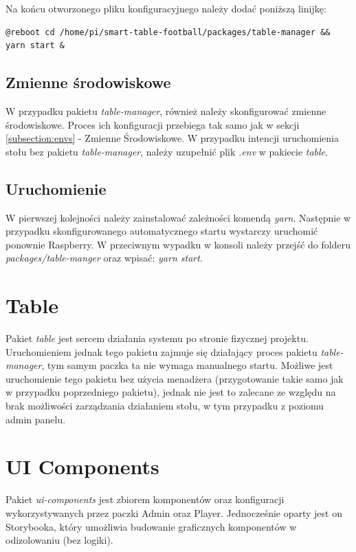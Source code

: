Na końcu otworzonego pliku konfiguracyjnego należy dodać poniższą linijkę:
\begin{lstlisting}[caption={Fragment konfiguracji crontab}]
@reboot cd /home/pi/smart-table-football/packages/table-manager && yarn start &
\end{lstlisting}

\subsection{Zmienne środowiskowe}
W przypadku pakietu \textit{table-manager}, również należy skonfigurować zmienne środowiskowe. Proces ich konfiguracji przebiega tak samo jak w sekcji \ref{subsection:envs} - Zmienne Środowiskowe. W przypadku intencji uruchomienia stołu bez pakietu \textit{table-manager}, należy uzupełnić plik \textit{.env} w pakiecie \textit{table}.

\subsection{Uruchomienie}
W pierwszej kolejności należy zainstalować zależności komendą \textit{yarn}. Następnie w przypadku skonfigurowanego automatycznego startu wystarczy uruchomić ponownie Raspberry. W przeciwnym wypadku w konsoli należy przejść do folderu \textit{packages/table-manger} oraz wpisać: \textit{yarn start}.

\section{Table}
Pakiet \textit{table} jest sercem działania systemu po stronie fizycznej projektu. Uruchomieniem jednak tego pakietu zajmuje się działający proces pakietu \textit{table-manager}, tym samym paczka ta nie wymaga manualnego startu. Możliwe jest uruchomienie tego pakietu bez użycia menadżera (przygotowanie takie samo jak w przypadku poprzedniego pakietu), jednak nie jest to zalecane ze względu na brak możliwości zarządzania działaniem stołu, w tym przypadku z poziomu admin panelu.

\section{UI Components}
Pakiet \textit{ui-components} jest zbiorem komponentów oraz konfiguracji wykorzystywanych przez paczki Admin oraz Player. Jednocześnie oparty jest on Storybooka, który umożliwia budowanie graficznych komponentów w odizolowaniu (bez logiki).

